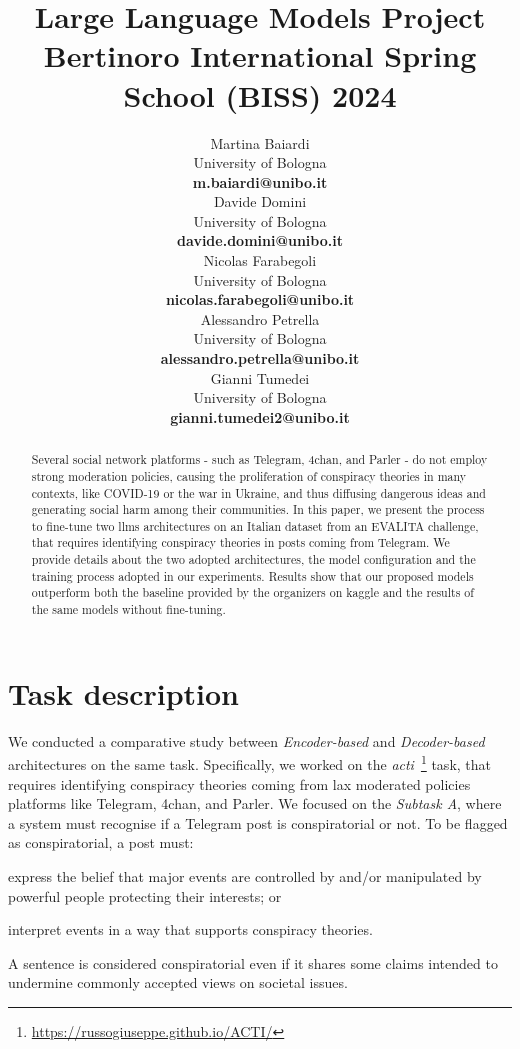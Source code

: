\documentclass[11pt]{article}
\title{Large Language Models Project \\
Bertinoro International Spring School (BISS) 2024}
\author{
  Martina Baiardi \\
  University of Bologna \\
  {\bf m.baiardi@unibo.it} \\ \And
  Davide Domini \\
  University of Bologna \\
  {\bf davide.domini@unibo.it} \\  \And
  Nicolas Farabegoli \\
  University of Bologna \\
  {\bf nicolas.farabegoli@unibo.it} \\  \AND
  Alessandro Petrella\\
  University of Bologna \\
  {\bf alessandro.petrella@unibo.it} \\ \And
  Gianni Tumedei \\
  University of Bologna \\
  {\bf gianni.tumedei2@unibo.it}
}
\newcommand{\meta}[1]{{\color{blue}#1}}
\begin{document}
\maketitle

\begin{abstract}
Several social network platforms - such as Telegram, 4chan, and Parler - do not employ strong moderation
policies, causing the proliferation of conspiracy theories in many contexts, like COVID-19 or the war
in Ukraine, and thus diffusing dangerous ideas and generating social harm among their communities.
%
In this paper, we present the process to fine-tune two \acp{llm} architectures
on an Italian dataset from an EVALITA challenge, that requires identifying
conspiracy theories in posts coming from Telegram.
%
We provide details about the two adopted architectures, the model configuration and the training
process adopted in our experiments.
%
Results show that our proposed models outperform both the baseline provided by the organizers on kaggle and 
the results of the same models without fine-tuning.
\end{abstract}

\section{Task description}\label{sec:task-description}
We conducted a comparative study between \emph{Encoder-based} and \emph{Decoder-based} architectures
on the same task.
%
Specifically, we worked on the \emph{\ac{acti}}~\footnote{\url{https://russogiuseppe.github.io/ACTI/}}
task, that requires identifying conspiracy theories coming from lax moderated policies platforms like
Telegram, 4chan, and Parler.
%
We focused on the \emph{Subtask A}, where a system must recognise if a Telegram post is conspiratorial
or not.
%
To be flagged as conspiratorial, a post must:
\begin{enumerate*}[label=(\roman{*})]
  \item express the belief that major events are controlled by and/or manipulated by powerful people protecting their interests; or
  \item interpret events in a way that supports conspiracy theories.
\end{enumerate*}
A sentence is considered conspiratorial even if it shares some claims intended to undermine commonly accepted views on societal issues.
\end{document}
